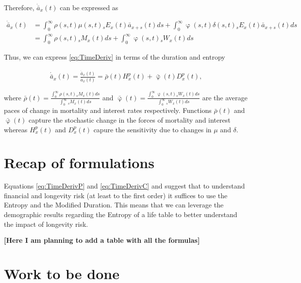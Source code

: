 \documentclass[12pt]{article}
\begin{document}
Therefore, $\dot{\bar{a}} _x(t)$ can be expressed as


\begin{equation}\label{eq:TimeDerivP3}
\begin{split}
\dot{\bar{a}}_{x}(t) &=  \int_0^\infty \rho(s,t) \mu(s,t){}_sE_x(t) \bar{a}_{x+s}(t) ds +\int_0^\infty  \upvarphi(s,t) \delta(s,t)  {}_sE_x(t) \bar{a}_{x+s}(t) ds\\
&= \int_0^\infty \rho(s,t) {}_sM_x(t)  ds +\int_0^\infty  \upvarphi(s,t) {}_sW_x(t)  ds
\end{split}
\end{equation}

Thus, we can express \ref{eq:TimeDeriv} in terms of the duration and entropy


\begin{equation}\label{eq:TimeDerivP}
\begin{split}
 \acute{\bar{a}}_x(t) = \frac{\dot{\bar{a}}_x(t)}{\bar{a}_x(t)}  = \bar{\rho}(t){H}^{p}_x(t)+\bar{\upvarphi}(t){D}^{p}_x(t),
\end{split}
\end{equation}

where $\bar{\rho}(t)= \frac{\int_0^\infty \rho(s,t) {}_sM_x(t)  ds}{\int_0^\infty  {}_sM_x(t)ds}$ and 
$\bar{\upvarphi}(t)= \frac{\int_0^\infty \upvarphi(s,t) {}_sW_x(t)  ds}{\int_0^\infty {}_sW_x(t) ds}$ are the average paces of change in mortality and interest rates respectively. Functions $\bar{\rho}(t)$ and $\bar{\upvarphi}(t)$ capture the stochastic change in the forces of mortality and interest whereas ${H}^{p}_x(t)$ and ${D}^{p}_x(t)$ capure the sensitivity due to changes in $\mu$ and $\delta$.




\section{Recap of formulations}


  Equations \ref{eq:TimeDerivP} and \ref{eq:TimeDerivC} and suggest that to understand financial and longevity risk (at least to the first order) it suffices to use the Entropy and the Modified Duration. This means that we can leverage the demographic results regarding the Entropy of a life table to better understand the impact of longevity risk.


\textbf{[Here I am planning to add a table with all the formulas]}



\section{Work to be done}\label{work-to-be-done}
\end{document}

